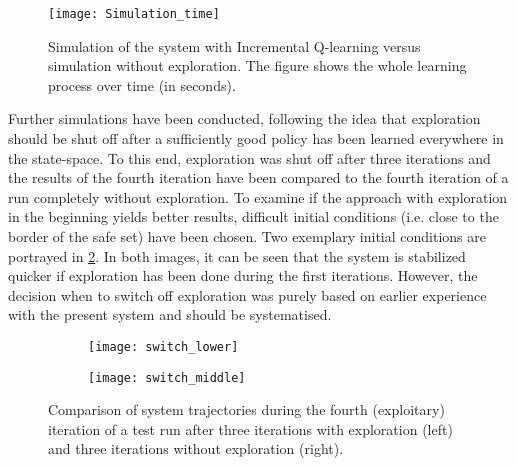 \documentclass[../main.tex]{subfiles}
\begin{document}
\begin{figure}
    \centering
    \texttt{[image: Simulation\_time]}
        \caption{Simulation of the system with Incremental Q-learning versus simulation without exploration. The figure shows the whole learning process over time (in seconds).}\label{fig:Simulation_time}
\end{figure}
Further simulations have been conducted, following the idea that exploration should be shut off after a sufficiently good policy has been learned everywhere in the state-space. To this end, exploration was shut off after three iterations and the results of the fourth iteration have been compared to the fourth iteration of a run completely without exploration. To examine if the approach with exploration in the beginning yields better results, difficult initial conditions (i.e. close to the border of the safe set) have been chosen. Two exemplary initial conditions are portrayed in \ref{fig:Simulation_shutoff}. In both images, it can be seen that the system is stabilized quicker if exploration has been done during the first iterations. However, the decision when to switch off exploration was purely based on earlier experience with the present system and should be systematised.

\begin{figure}[H]
    \centering
    \begin{subfigure}[b]{\textwidth}
    \texttt{[image: switch\_lower]}
    \end{subfigure}
    
    \begin{subfigure}[b]{\textwidth}
    \texttt{[image: switch\_middle]}
    \end{subfigure}
        \caption{Comparison of system trajectories during the fourth (exploitary) iteration of a test run after three iterations with exploration (left) and three iterations without exploration (right).}  \label{fig:Simulation_shutoff}
\end{figure}
\end{document}
